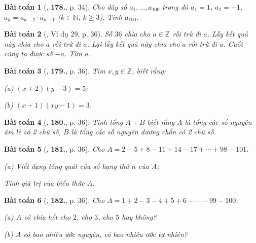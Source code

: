 \documentclass{article}
\numberwithin{equation}{section}
\newtheorem{baitoan}{Bài toán}[section]
\begin{document}
\begin{baitoan}[\cite{Binh_Toan_6_tap_1}, \textbf{178.}, p. 34]
	Cho dãy số $a_1,\ldots,a_{100}$ trong đó $a_1 = 1$, $a_2 = -1$, $a_k = a_{k-2}\cdot a_{k-1}$ ($k\in\mathbb{N}$, $k\ge 3$). Tính $a_{100}$.
\end{baitoan}

\begin{baitoan}[\cite{Binh_Toan_6_tap_1}, Ví dụ 29, p. 36]
	Số $36$ chia cho $a\in\mathbb{Z}$ rồi trừ đi $a$. Lấy kết quả này chia cho $a$ rồi trừ đi $a$. Lại lấy kết quả này chia cho $a$ rồi trừ đi $a$. Cuối cùng ta được số $-a$. Tìm $a$.
\end{baitoan}

\begin{baitoan}[\cite{Binh_Toan_6_tap_1}, \textbf{179.}, p. 36]
	Tìm $x,y\in\mathbb{Z}$, biết rằng:
	\begin{enumerate*}
		\item[(a)] $(x + 2)(y - 3) = 5$;
		\item[(b)] $(x + 1)(xy - 1) = 3$.
	\end{enumerate*}
\end{baitoan}

\begin{baitoan}[\cite{Binh_Toan_6_tap_1}, \textbf{180.}, p. 36]
	Tính tổng $A + B$ biết rằng $A$ là tổng các số nguyên âm lẻ có 2 chữ số, $B$ là tổng các số nguyên dương chẵn có 2 chữ số.
\end{baitoan}

\begin{baitoan}[\cite{Binh_Toan_6_tap_1}, \textbf{181.}, p. 36]
	Cho $A = 2 - 5 + 8 - 11 + 14 - 17 + \cdots + 98 - 101$.
	\begin{enumerate*}
		\item[(a)] Viết dạng tổng quát của số hạng thứ $n$ của $A$;
		\item Tính giá trị của biểu thức $A$.
	\end{enumerate*}
\end{baitoan}

\begin{baitoan}[\cite{Binh_Toan_6_tap_1}, \textbf{182.}, p. 36]
	Cho $A = 1 + 2 - 3 - 4 + 5 + 6 - \cdots - 99 - 100$.
	\begin{enumerate*}
		\item[(a)] $A$ có chia hết cho $2$, cho $3$, cho $5$ hay không?
		\item[(b)] $A$ có bao nhiêu ước nguyên, có bao nhiêu ước tự nhiên?
	\end{enumerate*}
\end{baitoan}
\end{document}
